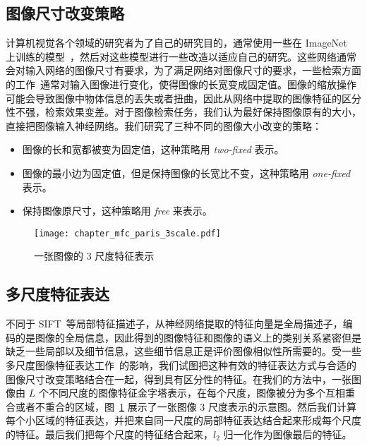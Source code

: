 \subsection{图像尺寸改变策略}\label{subsec:img_resize_strategy}
计算机视觉各个领域的研究者为了自己的研究目的，通常使用一些在 ImageNet~\cite{Russakovsky2015ImageNetLS} 上训练的模型~\cite{Krizhevsky2012ImageNetCW,Simonyan2014VeryDC,Szegedy2015GoingDW,He2016DeepRL}，然后对这些模型进行一些改造以适应自己的研究。这些网络通常会对输入网络的图像尺寸有要求，为了满足网络对图像尺寸的要求，一些检索方面的工作~\cite{Gong2014MultiscaleOP,Babenko2015AggregatingLD}通常对输入图像进行变化，使得图像的长宽变成固定值。图像的缩放操作可能会导致图像中物体信息的丢失或者扭曲，因此从网络中提取的图像特征的区分性不强，检索效果变差。对于图像检索任务，我们认为最好保持图像原有的大小，直接把图像输入神经网络。我们研究了三种不同的图像大小改变的策略：
\begin{itemize}
\item 图像的长和宽都被变为固定值，这种策略用 \emph{two-fixed} 表示。

\item 图像的最小边为固定值，但是保持图像的长宽比不变，这种策略用 \emph{one-fixed} 表示。

\item 保持图像原尺寸，这种策略用 \emph{free} 来表示。
\end{itemize}

\begin{figure}[!t]
	\centering
	\texttt{[image: chapter\_mfc\_paris\_3scale.pdf]}
	\caption{一张图像的 3 尺度特征表示}
	\label{fig:img_multiscale_feature}
\end{figure}

\subsection{多尺度特征表达}\label{subsec:multiscale_img_repr}
不同于 SIFT~\cite{Lowe2004DistinctiveIF}等局部特征描述子，从神经网络提取的特征向量是全局描述子，编码的是图像的全局信息，因此得到的图像特征和图像的语义上的类别关系紧密但是缺乏一些局部以及细节信息，这些细节信息正是评价图像相似性所需要的。受一些多尺度图像特征表达工作~\cite{Lazebnik2006BeyondBO,He2014SpatialPP}的影响，我们试图把这种有效的特征表达方式与合适的图像尺寸改变策略结合在一起，得到具有区分性的特征。在我们的方法中，一张图像由 $L$ 个不同尺度的图像特征金字塔表示，在每个尺度，图像被分为多个互相重合或者不重合的区域，图~\ref{fig:img_multiscale_feature} 展示了一张图像 3 尺度表示的示意图。然后我们计算每个小区域的特征表达，并把来自同一尺度的局部特征表达结合起来形成每个尺度的特征。最后我们把每个尺度的特征结合起来，$l_2$ 归一化作为图像最后的特征。

